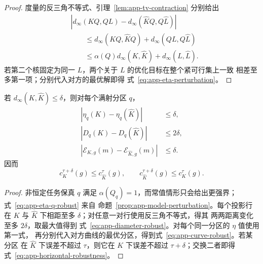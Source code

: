\begin{proof}
度量的反三角不等式、引理~\ref{lem:app-tv-contraction} 分别给出
\begin{align*}
 &\left|d_\infty(KQ,QL)-d_\infty(\widehat KQ,Q\widehat L)\right|\\
 &\qquad\le d_\infty(KQ,\widehat KQ)+d_\infty(QL,Q\widehat L)\\
 &\qquad\le \alpha(Q)d_\infty(K,\widehat K)+d_\infty(L,\widehat L).
\end{align*}
若第二个核固定为同一 $L$，两个关于 $L$ 的优化目标在整个紧可行集上一致
相差至多第一项；分别代入对方的最优解即得
式~\eqref{eq:app-eta-perturbation}。
\end{proof}

\begin{corollary}[确定性分区与复杂度曲线的稳健性]
\label{cor:app-diameter-curve-robustness}
若 $d_\infty(K,\widehat K)\le\delta$，则对每个满射分区 $q$，
\begin{align}
 |\eta_q(K)-\eta_q(\widehat K)|&\le\delta,
 \label{eq:app-eta-q-robust}\\
 |D_q(K)-D_q(\widehat K)|&\le2\delta,
 \label{eq:app-diameter-robust}\\
 |\mathcal E_{K,g}(m)-\mathcal E_{\widehat K,g}(m)|&\le\delta.
 \label{eq:app-curve-robust}
\end{align}
因而
\begin{equation}
 c_K^{\tau+\delta}(g)\le c_{\widehat K}^{\tau}(g),
 \qquad
 c_{\widehat K}^{\tau+\delta}(g)\le c_K^\tau(g).
 \label{eq:app-horizontal-robustness}
\end{equation}
\end{corollary}

\begin{proof}
非恒定任务保真 $q$ 满足 $\alpha(Q_q)=1$，而常值情形只会给出更强界；
式~\eqref{eq:app-eta-q-robust} 来自
命题~\ref{prop:app-model-perturbation}。每个投影行在 $K$ 与
$\widehat K$ 下相距至多 $\delta$；对任意一对行使用反三角不等式，得其
两两距离变化至多 $2\delta$，取最大值得到
式~\eqref{eq:app-diameter-robust}。对每个同一分区的 $\eta$ 值使用第一式，
再分别代入对方曲线的最优分区，得到式~\eqref{eq:app-curve-robust}。若某分区
在 $\widehat K$ 下误差不超过 $\tau$，则它在 $K$ 下误差不超过
$\tau+\delta$；交换二者即得式~\eqref{eq:app-horizontal-robustness}。
\end{proof}

